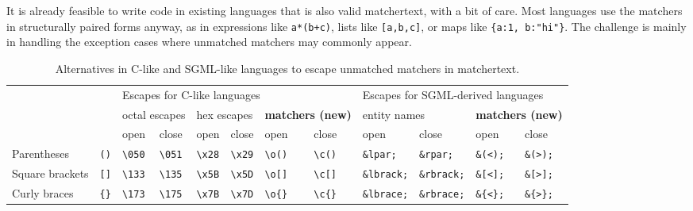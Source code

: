It is already feasible to write code in existing languages
that is also valid matchertext,
with a bit of care.
Most languages use the matchers in structurally paired forms anyway,
as in expressions like \verb|a*(b+c)|,
lists like \verb|[a,b,c]|,
or maps like \verb|{a:1, b:"hi"}|.
The challenge is mainly in handling the exception cases
where unmatched matchers may commonly appear.

\begin{table}[t]
\begin{center}
\begin{footnotesize}
\setlength{\tabcolsep}{4pt}
\begin{tabular}{ll||ll|ll|ll||ll|ll}
&		& \multicolumn{6}{|l||}{Escapes for C-like languages}
		& \multicolumn{4}{|l}{Escapes for SGML-derived languages} \\
&		& \multicolumn{2}{|l|}{octal escapes}
		& \multicolumn{2}{|l|}{hex escapes}
		& \multicolumn{2}{|l||}{\bf matchers (new)}
		& \multicolumn{2}{|l|}{entity names}
		& \multicolumn{2}{|l}{\bf matchers (new)}		\\
		&
		& open			& close
		& open			& close
		& open			& close
		& open			& close
		& open			& close		\\
\hline
Parentheses	& \verb|()|
		& \verb|\050|		& \verb|\051|
		& \verb|\x28|		& \verb|\x29|
		& \verb|\o()|		& \verb|\c()|
		& \verb|&lpar;|		& \verb|&rpar;|
		& \verb|&(<);|		& \verb|&(>);|	\\
Square brackets	& \verb|[]|
		& \verb|\133|		& \verb|\135|
		& \verb|\x5B|		& \verb|\x5D|
		& \verb|\o[]|		& \verb|\c[]|
		& \verb|&lbrack;|	& \verb|&rbrack;|
		& \verb|&[<];|		& \verb|&[>];|	\\
		
Curly braces	& \verb|{}|
		& \verb|\173|		& \verb|\175|
		& \verb|\x7B|		& \verb|\x7D|
		& \verb|\o{}|		& \verb|\c{}|
		& \verb|&lbrace;|	& \verb|&rbrace;|
		& \verb|&{<};|		& \verb|&{>};|	\\

\end{tabular}
\end{footnotesize}
\end{center}
\caption{Alternatives in C-like and SGML-like languages
	to escape unmatched matchers in matchertext.}
\label{tab:unmatched-matchers}
\end{table}


